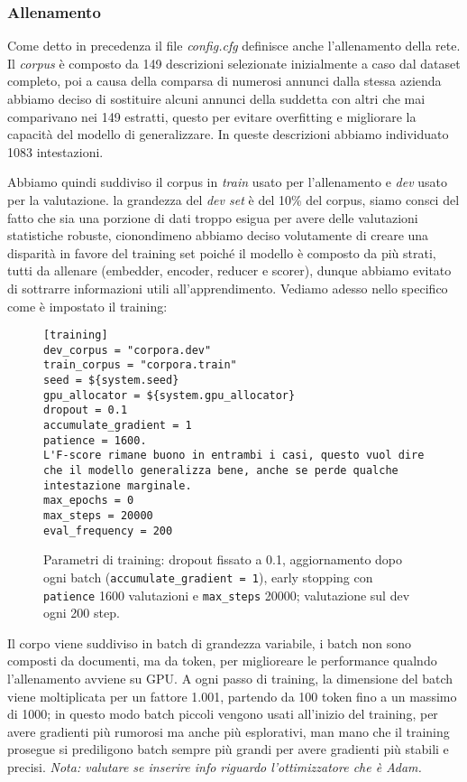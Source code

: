 \subsubsection{Allenamento}

\noindent Come detto in precedenza il file \textit{config.cfg} definisce anche l'allenamento della rete. Il \textit{corpus} è composto da 149 descrizioni selezionate inizialmente a caso dal dataset completo, poi a causa della comparsa di numerosi annunci dalla stessa azienda abbiamo deciso di sostituire alcuni annunci della suddetta con altri che mai comparivano nei 149 estratti, questo per evitare overfitting e migliorare la capacità del modello di generalizzare. In queste descrizioni abbiamo individuato 1083 intestazioni.

\noindent Abbiamo quindi suddiviso il corpus in \textit{train} usato per l'allenamento e \textit{dev} usato per la valutazione. la grandezza del \textit{dev set} è del 10\% del corpus, siamo consci del fatto che sia una porzione di dati troppo esigua per avere delle valutazioni statistiche robuste, cionondimeno abbiamo deciso volutamente di creare una disparità in favore del training set poiché il modello è composto da più strati, tutti da allenare (embedder, encoder, reducer e scorer), dunque abbiamo evitato di sottrarre informazioni utili all'apprendimento. Vediamo adesso nello specifico come è impostato il training:

\begin{figure}[H]
    \centering
    \scriptsize
\begin{lstlisting}[style=cmd]
[training]
dev_corpus = "corpora.dev"
train_corpus = "corpora.train"
seed = ${system.seed}
gpu_allocator = ${system.gpu_allocator}
dropout = 0.1
accumulate_gradient = 1
patience = 1600.
L'F-score rimane buono in entrambi i casi, questo vuol dire che il modello generalizza bene, anche se perde qualche intestazione marginale.
max_epochs = 0
max_steps = 20000
eval_frequency = 200
\end{lstlisting}
    \caption{Parametri di training: dropout fissato a 0.1, aggiornamento dopo ogni batch (\texttt{accumulate\_gradient = 1}), early stopping con \texttt{patience} 1600 valutazioni e \texttt{max\_steps} 20000; valutazione sul dev ogni 200 step.}
    \label{fig:cfg-training}
\end{figure}

\noindent Il corpo viene suddiviso in batch di grandezza variabile, i batch non sono composti da documenti, ma da token, per miglioreare le performance qualndo l'allenamento avviene su GPU. A ogni passo di training, la dimensione del batch viene moltiplicata per un fattore 1.001, partendo da 100 token fino a un massimo di 1000; in questo modo batch piccoli vengono usati all'inizio del training, per avere gradienti più rumorosi ma anche più esplorativi, man mano che il training prosegue si prediligono batch sempre più grandi per avere gradienti più stabili e precisi. \textit{Nota: valutare se inserire info riguardo l'ottimizzatore che è Adam.}

